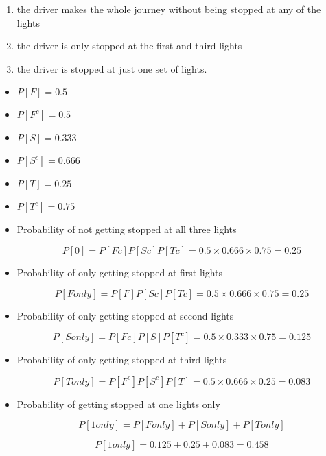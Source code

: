 \documentclass[a4paper,12pt]{article}
\begin{document}
\begin{enumerate}
\begin{enumerate}
\item    the driver makes the whole journey without being stopped at any of the lights

\item   the driver is only stopped at the first and third lights

\item  the driver is stopped at just one set of lights.
\end{enumerate}

\begin{framed}
\begin{multicols}{3}
\begin{itemize}
\item $P[F] = 0.5 $  
\item $P[F^c] = 0.5 $           
\item $P[S] = 0.333 $       
\item $P[S^c] = 0.666$
\item $P[T] = 0.25  $      
\item $P[T^c] = 0.75$
\end{itemize}
\end{multicols}


\begin{itemize}
\item Probability of not getting stopped at all three lights


\[P[0] =P[Fc]P[Sc]P[Tc] = 0.5 \times 0.666 \times 0.75 = 0.25\]


\item Probability of only getting stopped at first  lights


\[P[F only] = P[F]P[Sc]P[Tc] = 0.5\times 0.666\times 0.75 = 0.25\]


\item Probability of only getting stopped at second lights


\[P[S only] =P[Fc]P[S]P[T^c] = 0.5\times 0.333\times 0.75 = 0.125\]
\item Probability of only getting stopped at third  lights

\[P[T only] =P[F^c]P[S^c]P[T] = 0.5\times 0.666\times 0.25 = 0.083\]


\item Probability of getting stopped at one lights only 


\[P[1 only] =P[F only]+P[S only]+ P[T only]\]


\[P[1 only] = 0.125 + 0.25 + 0.083 = 0.458\]


\end{itemize}
\end{framed}
\end{enumerate}
\end{document}
